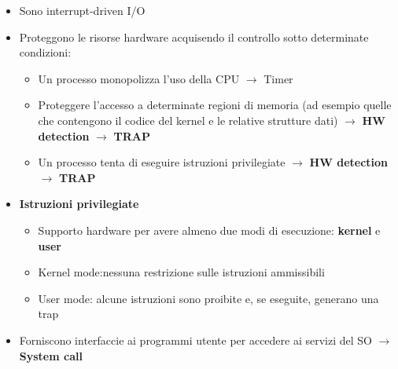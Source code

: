 \begin{itemize}
\item Sono interrupt-driven I/O
\item Proteggono le risorse hardware acquisendo il controllo sotto determinate condizioni:
 \begin{itemize}
 \item Un processo monopolizza l'uso della CPU $\rightarrow$ Timer
 \item Proteggere l'accesso a determinate regioni di memoria (ad esempio quelle che contengono il codice del kernel e le relative strutture dati) $\rightarrow$ \textbf{HW detection} $\rightarrow$ \textbf{TRAP}
 \item Un processo tenta di eseguire istruzioni privilegiate $\rightarrow$ \textbf{HW detection} $\rightarrow$ \textbf{TRAP}
 \end{itemize}
\item \textbf{Istruzioni privilegiate}
 \begin{itemize}
 \item Supporto hardware per avere almeno due modi di esecuzione: \textbf{kernel} e \textbf{user}
 \end{itemize}
 \begin{itemize}
 \item Kernel mode:nessuna restrizione sulle istruzioni ammissibili
 \item User mode: alcune istruzioni sono proibite e, se eseguite, generano una trap
 \end{itemize}
\item Forniscono interfaccie ai programmi utente per accedere ai servizi del SO $\rightarrow$ \textbf{System call}
\end{itemize}
